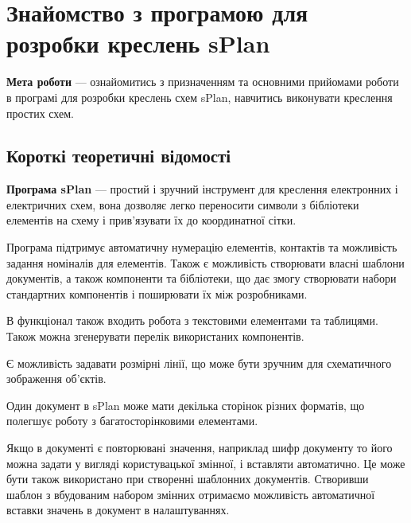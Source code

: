 \chapter[~]{Знайомство з програмою для розробки креслень sPlan}

\textbf{Мета роботи} --- ознайомитись з призначенням та основними прийомами роботи в програмі для
розробки креслень схем sPlan, навчитись виконувати креслення простих схем.


\section{Короткі теоретичні відомості}

\textbf{Програма sPlan} --- простий і зручний інструмент для креслення електронних і електричних
схем, вона дозволяє легко переносити символи з бібліотеки елементів на схему і прив'язувати їх до
координатної сітки.

Програма підтримує автоматичну нумерацію елементів, контактів та можливість задання номіналів для
елементів. Також є можливість створювати власні шаблони документів, а також компоненти та
бібліотеки, що дає змогу створювати набори стандартних компонентів і поширювати їх між розробниками.

В функціонал також входить робота з текстовими елементами та таблицями. Також можна згенерувати
перелік використаних компонентів.

Є можливість задавати розмірні лінії, що може бути зручним для схематичного зображення об'єктів.

Один документ в sPlan може мати декілька сторінок різних форматів, що полегшує роботу з
багатосторінковими елементами.

Якщо в документі є повторювані значення, наприклад шифр документу то його можна задати у вигляді
користувацької змінної, і вставляти автоматично. Це може бути також використано при створенні
шаблонних документів. Створивши шаблон з вбудованим набором змінних отримаємо можливість
автоматичної вставки значень в документ в налаштуваннях.
